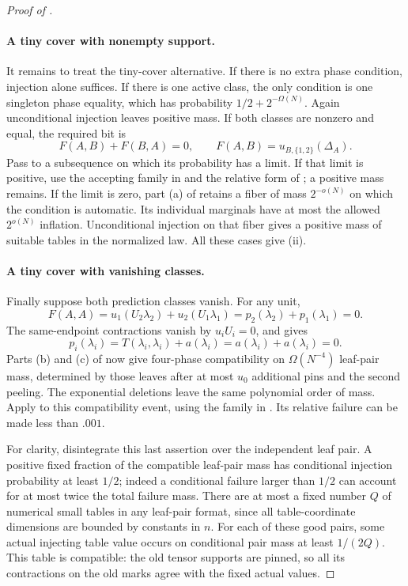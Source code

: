 \begin{proof}[Proof of ]
\paragraph{A tiny cover with nonempty support.}
It remains to treat the tiny-cover alternative.
If there is no extra phase condition, injection alone
suffices.  If there is one active class, the only
condition is one singleton phase equality, which has
probability \(1/2+2^{-\Omega(N)}\).  Again unconditional
injection leaves positive mass.
If both classes are nonzero and equal, the required bit
is
\[
 F(A,B)+F(B,A)=0,
 \qquad F(A,B)=u_{B,\{1,2\}}(\Delta_A).
 \]
Pass to a subsequence on which its probability has a
limit.  If that limit is positive, use the accepting
family in  and the relative
form of ; a positive mass remains.
If the limit is zero, part (a) of 
retains a fiber of mass \(2^{-o(N)}\) on which the
condition is automatic.  Its individual marginals have
at most the allowed \(2^{o(N)}\) inflation.
Unconditional injection on that fiber gives a positive
mass of suitable tables in the normalized law.
All these cases give (ii).

\paragraph{A tiny cover with vanishing classes.}
Finally suppose both prediction classes vanish.
For any unit,
\[
 F(A,A)=u_1(U_2\lambda_2)+u_2(U_1\lambda_1)
       =p_2(\lambda_2)+p_1(\lambda_1)=0.
 \]
The same-endpoint contractions vanish by \(u_iU_i=0\),
and  gives
\[
 p_i(\lambda_i)=T(\lambda_i,\lambda_i)+a(\lambda_i)
              =a(\lambda_i)+a(\lambda_i)=0.
 \]
Parts (b) and (c) of  now give
four-phase compatibility on \(\Omega(N^{-4})\) leaf-pair
mass, determined by those leaves after at most \(u_0\)
additional pins and the second peeling.
The exponential deletions leave the same polynomial
order of mass.  Apply  to this
compatibility event, using the family in
.  Its relative failure
can be made less than \(.001\).

For clarity, disintegrate this last assertion over the
independent leaf pair.  A positive fixed fraction of the
compatible leaf-pair mass has conditional injection
probability at least \(1/2\); indeed a conditional
failure larger than \(1/2\) can account for at most twice
the total failure mass.  There are at most a fixed
number \(Q\) of numerical small tables in any leaf-pair
format, since all table-coordinate dimensions are bounded
by constants in \(n\).  For each of these good pairs,
some actual injecting table value occurs on conditional
pair mass at least \(1/(2Q)\).  This table is compatible:
the old tensor supports are pinned, so all its contractions
on the old marks agree with the fixed actual values.


\end{proof}
